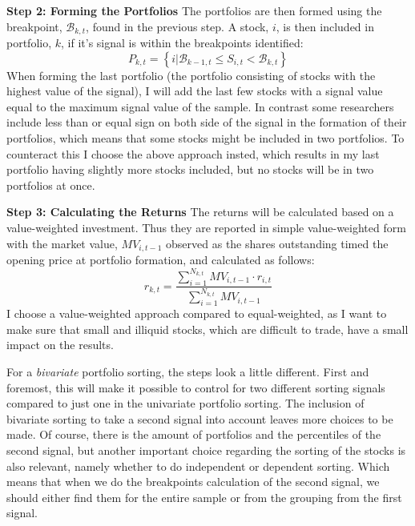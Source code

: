\textbf{Step 2: Forming the Portfolios} The portfolios are then formed using the breakpoint, $\mathcal{B}_{k,t}$, found in the previous step. A stock, $i$, is then included in portfolio, $k$, if it's signal is within the breakpoints identified:
\begin{equation}
	P_{k,t}=\left\{ i|\mathcal{B}_{k-1,t}\leq S_{i,t}<\mathcal{B}_{k,t}\right\} 
\end{equation}
When forming the last portfolio (the portfolio consisting of stocks with the highest value of the signal), I will add the last few stocks with a signal value equal to the maximum signal value of the sample. In contrast some researchers include less than or equal sign on both side of the signal in the formation of their portfolios, which means that some stocks might be included in two portfolios. To counteract this I choose the above approach insted, which results in my last portfolio having slightly more stocks included, but no stocks will be in two portfolios at once.

\textbf{Step 3: Calculating the Returns} The returns will be calculated based on a value-weighted investment. Thus they are reported in simple value-weighted form with the market value, $MV_{i,t-1}$ observed as the shares outstanding timed the opening price at portfolio formation,  and calculated as follows:
\begin{equation}
	r_{k,t}=\frac{\sum_{i=1}^{N_{k,t}}MV_{i,t-1}\cdot r_{i,t}}{\sum_{i=1}^{N_{k,t}}MV_{i,t-1}}
\end{equation}
I choose a value-weighted approach compared to equal-weighted, as I want to make sure that small and illiquid stocks, which are difficult to trade, have a small impact on the results. 

For a \textit{bivariate} portfolio sorting, the steps look a little different. First and foremost, this will make it possible to control for two different sorting signals compared to just one in the univariate portfolio sorting. The inclusion of bivariate sorting to take a second signal into account leaves more choices to be made. Of course, there is the amount of portfolios and the percentiles of the second signal, but another important choice regarding the sorting of the stocks is also relevant, namely whether to do independent or dependent sorting. Which means that when we do the breakpoints calculation of the second signal, we should either find them for the entire sample or from the grouping from the first signal.

